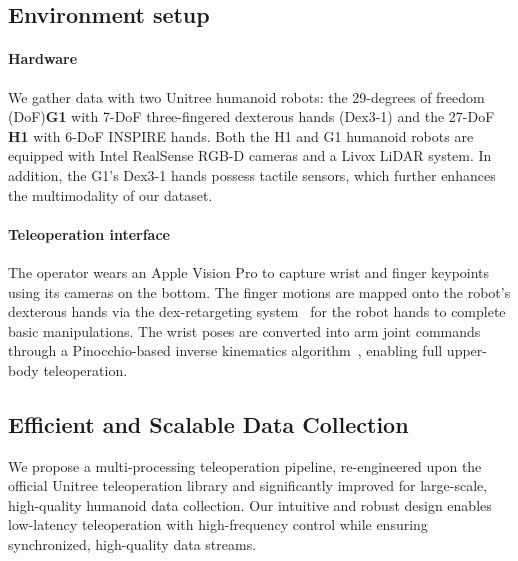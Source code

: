 \documentclass[letterpaper, 10pt, conference]{ieeeconf}
\newcommand{\jiageng}[1]{\textbf{\color{cyan}[Jiageng: #1]}}
\begin{document}
\label{headings}



\subsection{Environment setup} \label{subsec:env_setup}

\paragraph{Hardware}
We gather data with two Unitree humanoid robots: the 29-degrees of freedom (DoF)\textbf{G1} with 7-DoF three-fingered dexterous hands (Dex3-1) and the 27-DoF \textbf{H1} with 6-DoF INSPIRE hands. Both the H1 and G1 humanoid robots are equipped with Intel RealSense RGB-D cameras and a Livox LiDAR system. In addition, the G1's Dex3-1 hands possess tactile sensors, which further enhances the multimodality of our dataset. 


\paragraph{Teleoperation interface}
The operator wears an Apple Vision Pro to capture wrist and finger keypoints using its cameras on the bottom. The finger motions are mapped onto the robot’s dexterous hands via the dex-retargeting system~\cite{qin2023anyteleop} for the robot hands to complete basic manipulations. The wrist poses are converted into arm joint commands through a Pinocchio-based inverse kinematics algorithm~\cite{carpentierpinocchio}, enabling full upper-body teleoperation.


\subsection{Efficient and Scalable Data Collection} \label{subsec:pipeline}
We propose a multi-processing teleoperation pipeline, re-engineered upon the official Unitree teleoperation library and significantly improved for large-scale, high-quality humanoid data collection. Our intuitive and robust design enables low-latency teleoperation with high-frequency control while ensuring synchronized, high-quality data streams.\par
\end{document}
